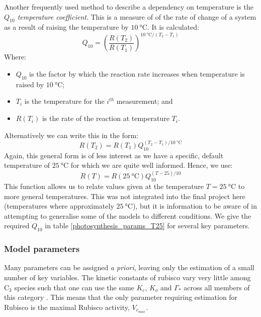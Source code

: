 \documentclass[11pt]{article} %
\begin{document}
Another frequently used method to describe a dependency on temperature is the \emph{$Q_{10}$ temperature coefficient}. This is a measure of of the rate of  change of a system as a result of raising the temperature by $\SI{10}{\celsius}$. It is calculated:
\begin{equation} \label{Q10_gen}
Q_{10} = \left ( \frac{R(T_2)}{R(T_1)} \right )^{\SI{10}{\celsius}/(T_2 - T_1)}
\end{equation}
Where:
\begin{itemize}
 \item $Q_{10}$ is the factor by which the reaction rate increases when temperature is raised by $\SI{10}{\celsius}$;
 \item $T_i$ is the temperature for the $i^{th}$ measurement; and
 \item $R(T_i)$ is the rate of the reaction at temperature $T_i$.
\end{itemize}
Alternatively we can write this in the form:
\begin{equation}
R(T_2) = R(T_1) Q_{10}^{(T_2 - T_1)/\SI{10}{\celsius}}
\end{equation}
Again, this general form is of less interest as we have a specific, default temperature of $\SI{25}{\celsius}$ for which we are quite well informed. Hence, we use:
\begin{equation} \label{Q10}
R(T) = R(\SI{25}{\celsius})Q_{10}^{(T-25)/10}
\end{equation}
This function allows us to relate values given at the temperature $T = \SI{25}{\celsius}$ to more general temperatures. This was not integrated into the final project here (temperatures where approximately $\SI{25}{\celsius}$), but it is information to be aware of in attempting to generalise some of the models to different conditions. We give the required $Q_{10}$ in table \ref{photosynthesis_params_T25} for several key parameters.

\subsubsection{Model parameters}
Many parameters can be assigned \emph{a priori}, leaving only the estimation of a small number of key variables. The kinetic constants of rubisco vary very little among C$_3$ species such that one can use the same $K_c$, $K_o$ and $\Gamma_*$ across all members of this category \cite{CaemmererBiochemicalmodelsleaf2000}. This means that the only parameter requiring estimation for Rubisco is the maximal Rubisco activity, $V_{c_{max}}$. 
\end{document}
